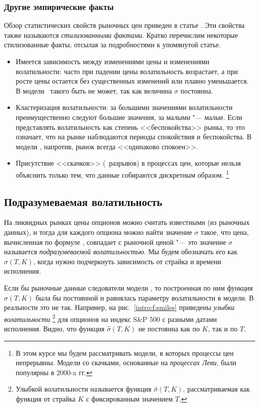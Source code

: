 \subsubsection{Другие эмпирические факты}

Обзор статистических свойств рыночных цен приведен в статье \cite{Cont01}.
Эти свойства также называются \emph{стилизованными фактами}.
Кратко перечислим некоторые стилизованные факты, отсылая за подробностями к упомянутой статье.
\begin{itemize}
\item Имеется зависимость между изменениями цены и изменениями волатильности: часто при падении цены волатильность возрастает, а при росте цены остается без существенных изменений или плавно уменьшается. В модели \bs\ такого быть не может, так как величина $\sigma$ постоянна.

\item Кластеризация волатильности: за большими значениями волатильности преимущественно следуют большие значения, за малыми "--- малые.
Если представлять волатильность как степень <<беспокойства>> рынка, то это означает, что на рынке наблюдаются периоды спокойствия и беспокойства.
В модели \bs, напротив, рынок всегда <<одинаково спокоен>>.

\item Присутствие <<скачков>> (\te\ разрывов) в процессах цен, которые нельзя объяснить только тем, что данные собираются дискретным образом.%
\footnote{В этом курсе мы будем рассматривать модели, в которых процессы цен непрерывны.
Модели со скачками, основанные на \emph{процессах Леви}, были популярны в 2000-x гг.}
\end{itemize}


\subsection{Подразумеваемая волатильность}

На ликвидных рынках цены опционов можно считать известными (из рыночных данных), и тогда для каждого опциона можно найти значение $\sigma$ такое, что цена, вычисленная по формуле \bs, совпадает с рыночной ценой "--- это значение $\sigma$ называется \emph{подразумеваемой волатильностью}.
Мы будем обозначать его как $\hat\sigma(T,K)$, когда нужно подчеркнуть зависимость от страйка и времени исполнения.

Если бы рыночные данные следователи модели \bs, то построенная по ним функция $\hat\sigma(T,K)$ была бы постоянной и равнялась параметру волатильности в модели.
В реальности это не так.
Например, на рис.~\ref{intro:f:smiles} приведены \emph{улыбки волатильности}%
\footnote{Улыбкой волатильности называется функция $\hat\sigma(T,K)$, рассматриваемая как функция от страйка $K$ с фиксированным значением $T$.}
для опционов на индекс S\&P 500 с разными датами исполнения.
Видно, что функция $\hat\sigma(T,K)$ не постоянна как по $K$, так и по $T$.

